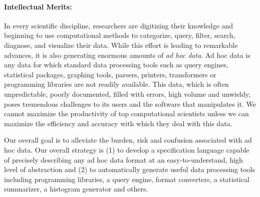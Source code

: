 
\paragraph*{Intellectual Merits:} 
In every scientific discipline, researchers are digitizing their knowledge and
beginning to use computational methods to categorize,
query, filter, search, diagnose, and visualize their data.  
While this effort is leading to remarkable advances,
it is also generating enormous amounts of {\em ad hoc data}.
Ad hoc data is any data for which standard data processing tools
such as query engines, statistical packages, graphing tools, parsers, printers,
transformers or programming libraries are not readily available.
This data, which is often unpredictable, poorly documented,
filled with errors, high volume and unwieldy,
poses tremendous challenges to its users and the software
that manipulates it.  We cannot maximize the productivity of top 
computational scientists unless we can maximize the efficiency and 
accuracy with which they deal with this data.

Our overall goal is to alleviate the burden, risk and confusion
associated with ad hoc data.  Our overall strategy is (1) to develop a
specification language capable of precisely describing any ad hoc data
format at an easy-to-understand, high level of abstraction and (2) to
automatically generate useful data processing tools including
programming libraries, a query engine, format converters, a
statistical summarizer, a histogram generator and others.
 
